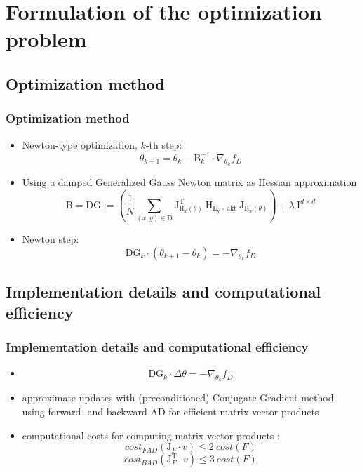 


\beamertemplatenavigationsymbolsempty{}


\section{Formulation of the optimization problem}

  \subsection{Optimization method}
  \begin{frame}
  \frametitle{Optimization method}
  \begin{itemize}
  	\item Newton-type optimization, $k$-th step: 
  	$$\theta_{k+1} = \theta_{k} - \mathrm{B}_{k}^{-1}\cdot\nabla_{\theta_{k}} f_{D}$$%
  	\pause
  	\item Using a damped Generalized Gauss Newton matrix as Hessian approximation
  	$$\mathrm{B} = \mathrm{DG} := \left(\frac{1}{N}\sum_{(x, y)\in\mathrm{D}}^{}\mathrm{J}_{\mathrm{R}_{x}(\theta)}^{\mathrm{T}}\:\mathrm{H}_{\mathrm{L_{y}\circ\:\text{akt}}}\:\mathrm{J}_{\mathrm{R}_{x}(\theta)}\right) + \lambda\:\mathrm{I}^{d\times d} $$
  	\item[] Newton step:
  	$$\mathrm{DG}_{k}\cdot (\theta_{k+1} - \theta_{k}) = -\nabla_{\theta_{k}}f_{D}$$
  \end{itemize}
\end{frame}

\subsection{Implementation details and computational efficiency}
\begin{frame}
\frametitle{Implementation details and computational efficiency}
\begin{itemize}
	\item[] $$\mathrm{DG}_{k}\cdot \Delta\theta = -\nabla_{\theta_{k}}f_{D}$$
	\item approximate updates with (preconditioned) Conjugate Gradient method using forward- and backward-AD for efficient matrix-vector-products
	\pause
	\item computational costs for computing matrix-vector-products :
	$$cost_{FAD}(\mathrm{J}_{F}\cdot v)\leq 2\:cost(F)$$
	$$cost_{BAD}(\mathrm{J}_{F}^{\mathrm{T}}\cdot v)\leq 3\:cost(F)$$
\end{itemize}
\end{frame}
  
